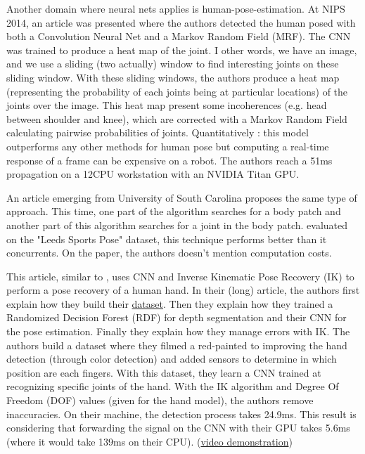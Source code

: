 \documentclass[a4paper]{article}
\begin{document}
			Another domain where neural nets applies is human-pose-estimation. At NIPS 2014, an article\cite{tompson2014joint} was presented where the authors detected the human posed with both a Convolution Neural Net and a Markov Random Field (MRF). The CNN was trained to produce a heat map of the joint. I other words, we have an image, and we use a sliding (two actually) window to find interesting joints on these sliding window. With these sliding windows, the authors produce a heat map (representing the probability of each joints being at particular locations) of the joints over the image. This heat map present some incoherences (e.g. head between shoulder and knee), which are corrected with a Markov Random Field calculating pairwise probabilities of joints. Quantitatively : this model outperforms any other methods for human pose but computing a real-time response of a frame can be expensive on a robot. The authors reach a 51ms propagation on a 12CPU workstation with an NVIDIA Titan GPU. 

			An article\cite{fan2015combining} emerging from University of South Carolina proposes the same type of approach. This time, one part of the algorithm searches for a body patch and another part of this algorithm searches for a joint in the body patch. evaluated on the "Leeds Sports Pose" dataset, this technique performs better than it concurrents. On the paper, the authors doesn't mention computation costs.


			This article\cite{tompson2014real}, similar to \cite{tompson2014joint}, uses CNN and Inverse Kinematic Pose Recovery (IK) to perform a pose recovery of a human hand. In their (long) article, the authors first explain how they build their \href{http://cims.nyu.edu/~tompson/NYU_Hand_Pose_Dataset.htm}{dataset}. Then they explain how they trained a Randomized Decision Forest (RDF) for depth segmentation and their CNN for the pose estimation. Finally they explain how they manage errors with IK. The authors build a dataset where they filmed a red-painted to improving the hand detection (through color detection) and added sensors to determine in which position are each fingers. With this dataset, they learn a CNN trained at recognizing specific joints of the hand. With the IK algorithm and Degree Of Freedom (DOF) values (given for the hand model), the authors remove inaccuracies. On their machine, the detection process takes 24.9ms. This result is considering that forwarding the signal on the CNN with their GPU takes 5.6ms (where it would take 139ms on their CPU). (\href{https://www.youtube.com/watch?v=J4c_x1QnW0A}{video demonstration})
\end{document}
